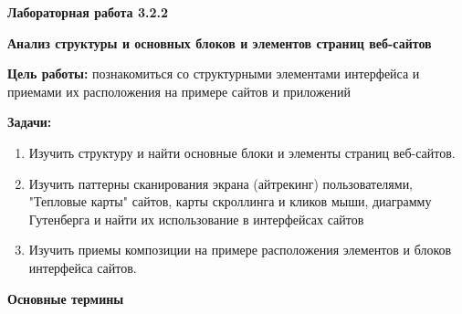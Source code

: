 
\graphicspath{ {3.2.2/models/} }

\pagestyle{fancy}
\fancyhead{}
\renewcommand{\headrulewidth}{0pt}


\begin{center}
    \textbf{Лабораторная работа 3.2.2}

    \textbf{Анализ структуры и основных блоков и элементов страниц веб-сайтов}
\end{center}

\textbf{Цель работы:} познакомиться со структурными элементами интерфейса и приемами их расположения на примере сайтов и приложений
\bigskip

\textbf{Задачи:}

\begin{enumerate}
    \item Изучить структуру и найти основные блоки и элементы страниц веб-сайтов.
    \item Изучить паттерны сканирования экрана (айтрекинг) пользователями, "Тепловые карты" сайтов, карты скроллинга и кликов мыши, диаграмму Гутенберга и найти их использование в интерфейсах  сайтов 
    \item Изучить приемы композиции на примере расположения элементов и блоков интерфейса сайтов.

\end{enumerate}
\bigskip

\textbf{Основные термины}

